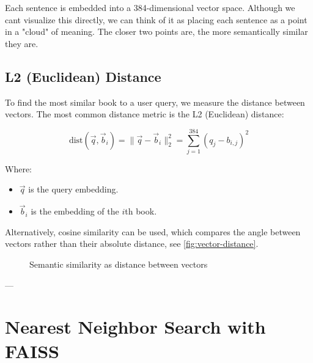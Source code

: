 Each sentence is embedded into a 384-dimensional vector space. Although we cant visualize this directly, we can think of it as placing each sentence as a point in a "cloud" of meaning. The closer two points are, the more semantically similar they are.

\subsection*{L2 (Euclidean) Distance}

To find the most similar book to a user query, we measure the distance between vectors. The most common distance metric is the L2 (Euclidean) distance:

\[
\text{dist}(\vec{q}, \vec{b}_i) = \|\vec{q} - \vec{b}_i\|_2^2 = \sum_{j=1}^{384} (q_j - b_{i,j})^2
\]

Where:
\begin{itemize}
    \item $\vec{q}$ is the query embedding.
    \item $\vec{b}_i$ is the embedding of the $i$th book.
\end{itemize}

Alternatively, cosine similarity can be used, which compares the angle between vectors rather than their absolute distance, see \autoref{fig:vector-distance}.

\begin{figure}[H]
    \centering
    \caption{Semantic similarity as distance between vectors}
    \label{fig:vector-distance}
\end{figure}

---

\section{Nearest Neighbor Search with FAISS}
\label{sec:theory-faiss}

